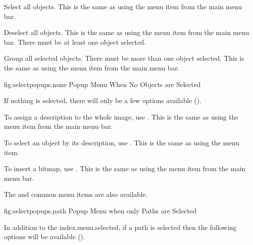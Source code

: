 
Select all \glspl{object}.
This is the same as using the  menu item from the
main menu bar.


Deselect all \glspl{object}.
This is the same as using the  menu item from the
main menu bar. There must be at least one \gls{object} selected.


Group all selected \glspl{object}. There must be more than one
object selected.
This is the same as using the  menu item from the
main menu bar.



\FloatFig
  {fig:selectpopups.none}
  {}
  {Popup Menu When No Objects are Selected}

If nothing is selected, there will only be a few options available
().


To assign a description to the whole image, use
. This is the same as using the
 menu item from the main menu bar.


To select an \gls{object} by its description, use
. This is the same as using the
 menu item.


To insert a \gls{bitmap}, use . This
is the same as using the  menu item from the main menu bar.

The  and  common menu
items are also available.



\FloatFig
  {fig:selectpopups.path}
  {}
  {Popup Menu when only Paths are Selected}

In addition to the \gls{index.menu.selected},
if a path is selected then the following options will be available
().


